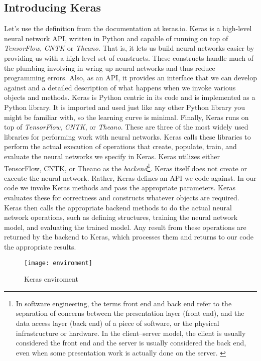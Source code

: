 \subsection{Introducing Keras}
\label{subsec:introduction_keras}
Let's use the definition from the documentation at keras.io.
Keras is a high-level neural network API, written in Python and capable of
running on top of \emph{TensorFlow}, \emph{CNTK} or 
\emph{Theano}.\cite{chollet2015keras}
That is, it lets us build neural networks easier by providing us with a
high-level set of constructs.
These constructs handle much of the plumbing involving in wring up neural
networks and thus reduce programming errors.
Also, as an API, it provides an interface that we can develop against and a
detailed description of what happens when we invoke various objects and methods.
Keras is Python centric in its code and is implemented as a Python library.
It is imported and used just like any other Python library you might be familiar
with, so the learning curve is minimal.
Finally, Keras runs on top of \emph{TensorFlow}, \emph{CNTK}, or \emph{Theano}.
These are three of the most widely used libraries for performing work with
neural networks.
Keras calls these libraries to perform the actual execution of operations that
create, populate, train, and evaluate the neural networks we specify in Keras.
Keras utilizes either TensorFlow, CNTK, or Theano as the 
\emph{backend}\footnote{In software engineering, the terms front end and back 
end refer to the separation of concerns between the presentation layer (front 
end), and the data access layer (back end) of a piece of software, or the 
physical infrastructure or hardware. In the client--server model, the client 
is usually considered the front end and the server is usually considered the 
back end, even when some presentation work is actually done on the server.
\cite{backend}}.
Keras itself does not create or execute the neural network.
Rather, Keras defines an API we code against. 
In our code we invoke Keras methods and pass the appropriate parameters.
Keras evaluates these for correctness and constructs whatever objects are
required.
Keras then calls the appropriate backend methods to do the actual neural 
network operations, such as defining structures, training the neural network 
model, and evaluating the trained model. Any result from these operations are 
returned by the backend to Keras, which processes them and returns to our code 
the appropriate results.
%
\begin{figure}[!h]
\centering
\texttt{[image: enviroment]}
\caption{Keras enviroment}
\label{fig:nn_layer}
\end{figure}
%
